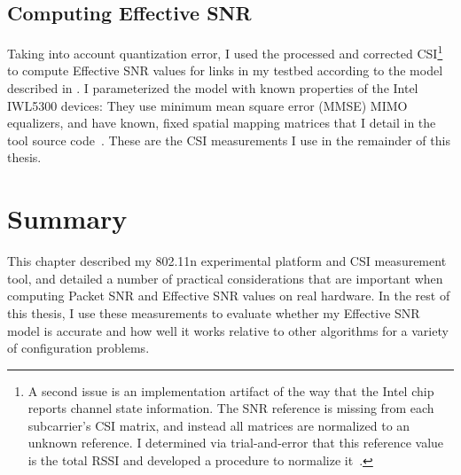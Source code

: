 \subsection{Computing Effective SNR}
Taking into account quantization error, I used the processed and corrected CSI\footnote{A second issue is an implementation artifact of the way that the Intel chip reports channel state information. The SNR reference is missing from each subcarrier's CSI matrix, and instead all matrices are normalized to an unknown reference. I determined via trial-and-error that this reference value is the total RSSI and developed a procedure to normalize it~\cite[\texttt{matlab/get\_scaled\_csi.m}]{csitool_code}.} to compute Effective SNR values for links in my testbed according to the model described in . I parameterized the model with known properties of the Intel IWL5300 devices: They use minimum mean square error (MMSE) MIMO equalizers, and have known, fixed spatial mapping matrices that I detail in the tool source code~\cite[\texttt{matlab/sm\_matrices.m}]{csitool_code}. These are the CSI measurements I use in the remainder of this thesis.

\section{Summary}
This chapter described my 802.11n experimental platform and CSI measurement tool, and detailed a number of practical considerations that are important when computing Packet SNR and Effective SNR values on real hardware. In the rest of this thesis, I use these measurements to evaluate whether my Effective SNR model is accurate and how well it works relative to other algorithms for a variety of configuration problems.

\ifx\mainfile\undefined

\fi